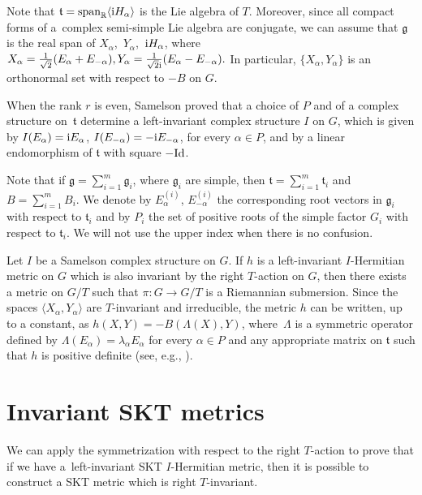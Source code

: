 \documentclass[pdftex]{sigma}
\numberwithin{equation}{section}
\begin{document}
Note that $\mathfrak t = {\rm span}_{\mathbb R} \langle {\rm i} H_{\alpha}\rangle$ is the Lie algebra of $T$. Moreover, since all compact forms of a~complex semi-simple Lie algebra are conjugate, we can assume that $\mathfrak g$ is the real span of $X_{\alpha}$,~$Y_{\alpha}$,~${\rm i}H_{\alpha}$, where $X_{\alpha} = \frac{1}{\sqrt{2}}(E_{\alpha}+E_{-\alpha}), Y_{\alpha} = \frac{1}{\sqrt{2}{\rm i}}(E_{\alpha}-E_{-\alpha}).$
In particular, $\{ X_{\alpha}, Y_{\alpha} \} $ is an orthonormal set with respect to $- B$ on $G$.


When the rank $r$ is even, Samelson proved that a choice of $P$ and of a complex structure on~$\mathfrak t $ determine a left-invariant complex structure $I$ on $G$, which is given by $I(E_{\alpha})= {\rm i}E_{\alpha}$, $I(E_{-\alpha})=-{\rm i}E_{-\alpha}$, for every $\alpha \in P$, and by a linear endomorphism of $\mathfrak{t}$ with square $-{{\rm Id}}$.

Note that if $ \mathfrak g = \sum_{i =1}^m \mathfrak g_i$, where $\mathfrak g_i$ are simple, then $\mathfrak t= \sum_{i=1}^m \mathfrak t_i$ and $B = \sum_{i=1}^m B_i$. We denote by $E_{\alpha}^{(i)}$, $E_{-\alpha}^{(i)}$ the corresponding root vectors in $\mathfrak g_i$ with respect to $\mathfrak t_i$ and by $P_i$ the set of positive roots of the simple factor $G_i$ with respect to $\mathfrak t_i$. We will not use the upper index when there is no confusion.

\begin{Remark} \label{remarkAkekseevski} Let $I$ be a Samelson complex structure on $G$. If $h$ is a left-invariant $I$-Hermitian metric on $G$ which is also invariant by the right $T$-action on $G$, then there exists a metric on $G/T$ such that $\pi\colon G\rightarrow G/T$ is a Riemannian submersion. Since the spaces $\langle X_{\alpha}, Y_{\alpha}\rangle$ are $T$-invariant and irreducible,
the metric $h$ can be written, up to a constant, as $h(X,Y)= -B (\Lambda(X),Y)$, where~$\Lambda$ is
a symmetric operator defined by $\Lambda(E_{\alpha})=\lambda_{\alpha} E_{\alpha}$ for every $\alpha \in P$ and any
appropriate matrix on $ \mathfrak t$ such that $h$ is positive definite (see, e.g., \cite{Arv}).
\end{Remark}

\section{Invariant SKT metrics}

 We can apply the symmetrization with respect to the right $T$-action to prove that if we have a~left-invariant SKT $I$-Hermitian metric,
then it is possible to construct a SKT metric which is right $T$-invariant.
\end{document}
